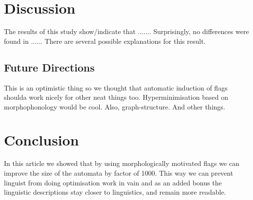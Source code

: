 \documentclass[11pt]{article}
\begin{document}
\section{Discussion}
\label{sec:discussion}

The results of this study show/indicate that .......
Surprisingly, no differences were found in ......
There are several possible explanations for this result.

\subsection{Future Directions}
\label{subsec:future-directions}

This is an optimistic thing so we thought that automatic induction of flags
shoulda work nicely for other neat things too. Hyperminimisation based on
morphophonology would be cool. Also, graph-structure. And other things.

\section{Conclusion}
\label{sec:conclusion}

In this article we showed that by using morphologically motivated flags we can
improve the size of the automata by factor of 1000. This way we can prevent
linguist from doing optimisation work in vain and as an added bonus the
linguistic descriptions stay closer to linguistics, and remain more readable.

\iffalse
\section*{Acknowledgments}

We thank our colleagues and we got funding.
\fi



\end{document}
